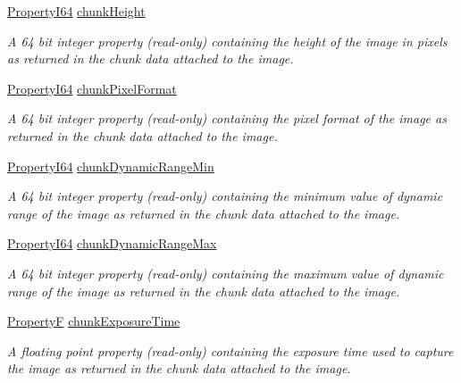 \begin{DoxyCompactItemize}
\hyperlink{group___common_interface_ga81749b2696755513663492664a18a893}{Property\+I64} \hyperlink{classmv_i_m_p_a_c_t_1_1acquire_1_1_request_a4e0047f0e5ea3bd83ebb77786a787f45}{chunk\+Height}
\begin{DoxyCompactList}\small\item\em A 64 bit integer property {\bfseries }(read-\/only) containing the height of the image in pixels as returned in the chunk data attached to the image. \end{DoxyCompactList}\item 
\hyperlink{group___common_interface_ga81749b2696755513663492664a18a893}{Property\+I64} \hyperlink{classmv_i_m_p_a_c_t_1_1acquire_1_1_request_aff2e190d6cc5eed39686684febf2b633}{chunk\+Pixel\+Format}
\begin{DoxyCompactList}\small\item\em A 64 bit integer property {\bfseries }(read-\/only) containing the pixel format of the image as returned in the chunk data attached to the image. \end{DoxyCompactList}\item 
\hyperlink{group___common_interface_ga81749b2696755513663492664a18a893}{Property\+I64} \hyperlink{classmv_i_m_p_a_c_t_1_1acquire_1_1_request_ada6f72ff16650724cfd26d8048673081}{chunk\+Dynamic\+Range\+Min}
\begin{DoxyCompactList}\small\item\em A 64 bit integer property {\bfseries }(read-\/only) containing the minimum value of dynamic range of the image as returned in the chunk data attached to the image. \end{DoxyCompactList}\item 
\hyperlink{group___common_interface_ga81749b2696755513663492664a18a893}{Property\+I64} \hyperlink{classmv_i_m_p_a_c_t_1_1acquire_1_1_request_a093f5ff03d40b74691acd10724f66885}{chunk\+Dynamic\+Range\+Max}
\begin{DoxyCompactList}\small\item\em A 64 bit integer property {\bfseries }(read-\/only) containing the maximum value of dynamic range of the image as returned in the chunk data attached to the image. \end{DoxyCompactList}\item 
\hyperlink{group___common_interface_gaf54865fe5a3d5cfd15f9a111b40d09f9}{Property\+F} \hyperlink{classmv_i_m_p_a_c_t_1_1acquire_1_1_request_a3a511879bedfe4c8104b12e512144bed}{chunk\+Exposure\+Time}
\begin{DoxyCompactList}\small\item\em A floating point property {\bfseries }(read-\/only) containing the exposure time used to capture the image as returned in the chunk data attached to the image. \end{DoxyCompactList}\item 

\end{DoxyCompactItemize}
